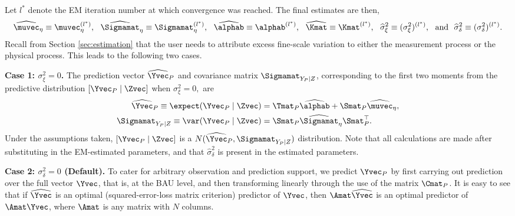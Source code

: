 Let $l^*$ denote the EM iteration number at which convergence was reached. The final estimates are then,
$$\widehat\muvec_\eta \equiv \muvec_\eta^{(l^*)},~~ \widehat\Sigmamat_\eta \equiv \Sigmamat_\eta^{(l^*)},~~ \widehat\alphab \equiv \alphab^{(l^*)}, ~~\widehat\Kmat \equiv \Kmat^{(l^*)}, ~~\widehat\sigma^2_\xi \equiv (\sigma^2_\xi)^{(l^*)}, \textrm{~~and~~} \widehat\sigma^2_\delta \equiv (\sigma^2_\delta)^{(l^*)}.$$
Recall from Section \ref{sec:estimation} that the user needs to attribute excess fine-scale variation to either the measurement process or the physical process. This leads to the following two cases.

{\bf Case 1: $\sigma^2_\xi = 0$.} The prediction vector $\widehat\Yvec_P$ and covariance matrix $\Sigmamat_{Y_P\mid Z}$, corresponding to the first two moments from the predictive distribution $[\Yvec_P \mid \Zvec]$ when $\sigma^2_\xi = 0,$ are
\begin{align*}
\widehat\Yvec_P \equiv \expect(\Yvec_P \mid \Zvec) &= \Tmat_P\widehat\alphab + \Smat_P\widehat\muvec_\eta, \\%
\Sigmamat_{Y_P \mid Z} \equiv \var(\Yvec_P\mid \Zvec) &= \Smat_P \widehat\Sigmamat_\eta\Smat_P^\top. %
\end{align*}
 Under the assumptions taken, $[\Yvec_P \mid \Zvec]$ is a $N(\widehat\Yvec_P,\Sigmamat_{Y_P \mid Z})$ distribution. Note that all calculations are made after substituting in the EM-estimated parameters, and that $\widehat\sigma^2_\delta$ is present in the estimated parameters.

{\bf Case 2: $\sigma^2_\delta = 0$ (Default).} To cater for arbitrary observation and prediction support, we predict $\Yvec_P$ by first carrying out prediction over the full vector $\Yvec$, that is, at the BAU level, and then transforming linearly through the use of the matrix $\Cmat_P$. It is easy to see that if $\widehat\Yvec$ is an optimal (squared-error-loss matrix criterion) predictor of $\Yvec$, then $\Amat\widehat\Yvec$ is an optimal predictor of $\Amat\Yvec$, where $\Amat$ is any matrix with $N$ columns.

